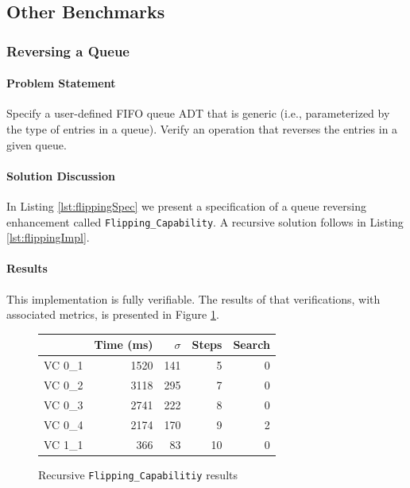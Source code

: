 \FloatBarrier
	\subsection{Other Benchmarks}

		\subsubsection{Reversing a Queue}	

\paragraph{Problem Statement}Specify a user-defined FIFO queue ADT that is generic (i.e., parameterized by the type of entries in a queue). Verify an operation that reverses the entries in a given queue.

\paragraph{Solution Discussion}In Listing \ref{lst:flippingSpec} we present a specification of a queue reversing enhancement called \texttt{Flipping\_Capability}.  A recursive solution follows in Listing \ref{lst:flippingImpl}.






\paragraph{Results}This implementation is fully verifiable.  The results of that verifications, with associated metrics, is presented in Figure \ref{fig:flippingResults}.

\begin{figure}
	\centering
	\begin{tabular}{lrrrr}
		\toprule
			& Time (ms)	& $\sigma$& Steps & Search \\
		\midrule
		VC 0\_1	& 1520		& 141	& 5 	& 0     \\
		VC 0\_2	& 3118		& 295	& 7 	& 0     \\
		VC 0\_3	& 2741		& 222	& 8 	& 0     \\
		VC 0\_4	& 2174		& 170	& 9 	& 2     \\
		VC 1\_1	& 366		& 83	& 10	& 0     \\
		\bottomrule
	\end{tabular}
	\caption{Recursive \texttt{Flipping\_Capabilitiy} results\label{fig:flippingResults}}
\end{figure}


